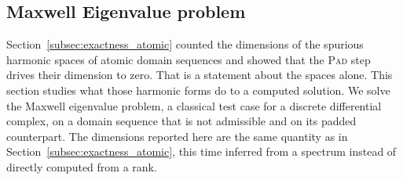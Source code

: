 \documentclass[a4paper, 12pt]{article}
\theoremstyle{definition}
\theoremstyle{plain}
\numberwithin{equation}{section}
\begin{document}
\FloatBarrier

\subsection{Maxwell Eigenvalue problem}
\label{subsec:maxwell}

Section~\ref{subsec:exactness_atomic} counted the dimensions of the spurious harmonic spaces of atomic domain sequences and showed that the \textsc{Pad} step drives their dimension to zero. That is a statement about the spaces alone. This section studies what those harmonic forms do to a computed solution. We solve the Maxwell eigenvalue problem, a classical test case for a discrete differential complex, on a domain sequence that is not admissible and on its padded counterpart. The dimensions reported here are the same quantity as in Section~\ref{subsec:exactness_atomic}, this time inferred from a spectrum instead of directly computed from a rank.
\end{document}
